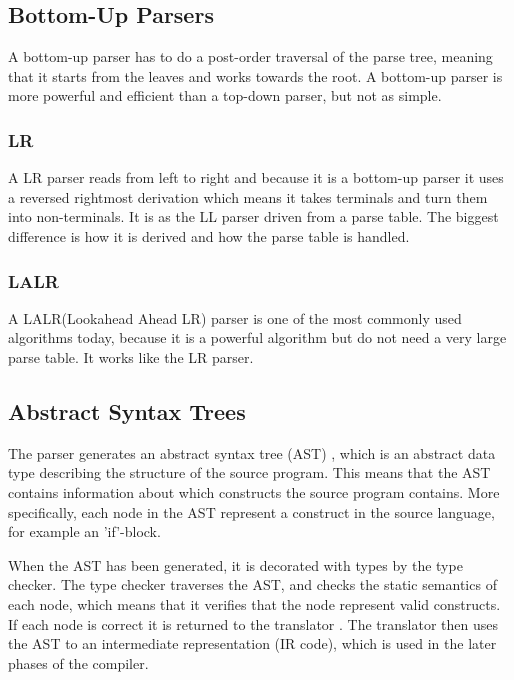 \subsection{Bottom-Up Parsers}

A bottom-up parser has to do a post-order traversal of the parse tree, meaning that it starts from the leaves and works towards the root.
A bottom-up parser is more powerful and efficient than a top-down parser, but not as simple.

\subsubsection*{LR}
A LR parser reads from left to right and because it is a bottom-up parser it uses a reversed rightmost derivation which means it takes terminals and turn them into non-terminals. It is as the LL parser driven from a parse table. The biggest difference is how it is derived and how the parse table is handled.  

\subsubsection*{LALR}
A LALR(Lookahead Ahead LR) parser is one of the most commonly used algorithms today, because it is a powerful algorithm but do not need a very large parse table. It works like the LR parser.

\subsection{Abstract Syntax Trees}
The parser generates an abstract syntax tree (AST) \citep{CraftingACompiler}, which is an abstract data type describing the structure of the source program. This means that the AST contains information about which constructs the source program contains. More specifically, each node in the AST represent a construct in the source language, for example an 'if'-block.

When the AST has been generated, it is decorated with types by the type checker. The type checker traverses the AST, and checks the static semantics of each node, which means that it verifies that the node represent valid constructs. If each node is correct it is returned to the translator \citep{CraftingACompiler}. The translator then uses the AST to an intermediate representation (IR code), which is used in the later phases of the compiler.